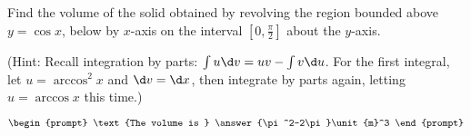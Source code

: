 \documentclass{ximera}
\author{Gregory Hartman \and Matthew Carr}
\begin{document}
\begin{exercise}






Find the volume of the solid obtained by revolving the region bounded above $y=\cos x$, below by $x$-axis on the interval $[0,\frac{\pi}{2}]$ about the $y$-axis. 

(Hint: Recall integration by parts: $\int u\d v=uv-\int v\d u$. For the first integral, let $u=\arccos^{2}x$ and $\d v=\d x$, then integrate by parts again, letting $u=\arccos x$ this time.)

\[
\begin{prompt}
\text{The volume is } \answer{\pi^2-2\pi}\unit{m}^3
\end{prompt}
\]




\end{exercise}
\end{document}
